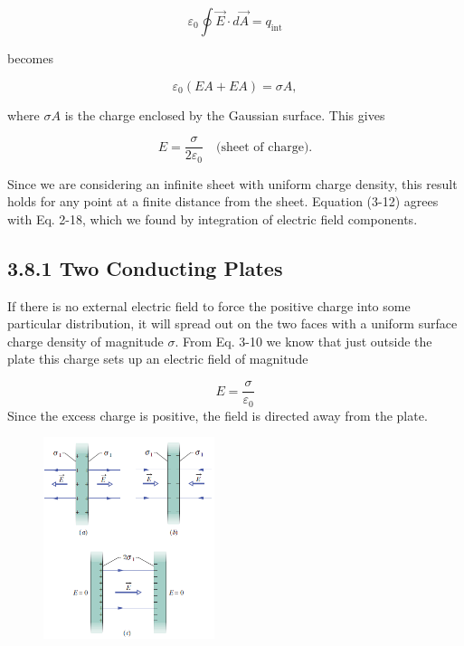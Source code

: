 \documentclass[12pt, a4paper]{article}
\begin{document}
		\begin{equation*}
			\varepsilon_0 \oint \vec{E} \cdot d\vec{A} = q_{\text{int}}
		\end{equation*}
		
		becomes
		
		\begin{equation*}
			\varepsilon_0 (EA + EA) = \sigma A,
		\end{equation*}
		
		where $\sigma A$ is the charge enclosed by the Gaussian surface. This gives
		
		\begin{equation*}
			E = \frac{\sigma}{2\varepsilon_0} \quad \text{(sheet of charge).}
			\tag{3-12}
		\end{equation*}
		
		Since we are considering an infinite sheet with uniform charge density, this result holds for any point at a finite distance from the sheet. Equation (3-12) agrees with Eq. 2-18, which we found by integration of electric field components.
		
		
		
		\subsection*{3.8.1 Two Conducting Plates}
		
		If there is no external electric field to force the positive charge into some particular distribution, it will spread out on the two faces with a uniform surface charge density of magnitude $\sigma$. From Eq. 3-10 we know that just outside the plate this charge sets up an electric field of magnitude
		
		\begin{equation*}
			E = \frac{\sigma}{\varepsilon_0}
		\end{equation*}
		Since the excess charge is positive, the field is directed away from the plate.
		
		\begin{figure}
			\centering
			\includegraphics[width=5cm]{Physics2_PNGs/two-conducting-plates.png}
			\caption*{}
			\label{fig:two-conducting-plates.png}
		\end{figure}
		
\end{document}
